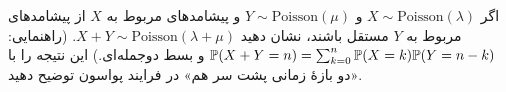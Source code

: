 \begin{exercise}\hard
اگر $X\sim\mathrm{Poisson}(\lambda)$ و $Y\sim\mathrm{Poisson}(\mu)$ و پیشامدهای مربوط به $X$ از پیشامدهای مربوط به $Y$ مستقل باشند، نشان دهید $X+Y\sim\mathrm{Poisson}(\lambda+\mu)$. (راهنمایی: $\P(X+Y=n)=\sum_{k=0}^n\P(X=k)\P(Y=n-k)$ و بسط دوجمله‌ای.) این نتیجه را با «دو بازهٔ زمانی پشت سر هم» در فرایند پواسون توضیح دهید.
\end{exercise}
